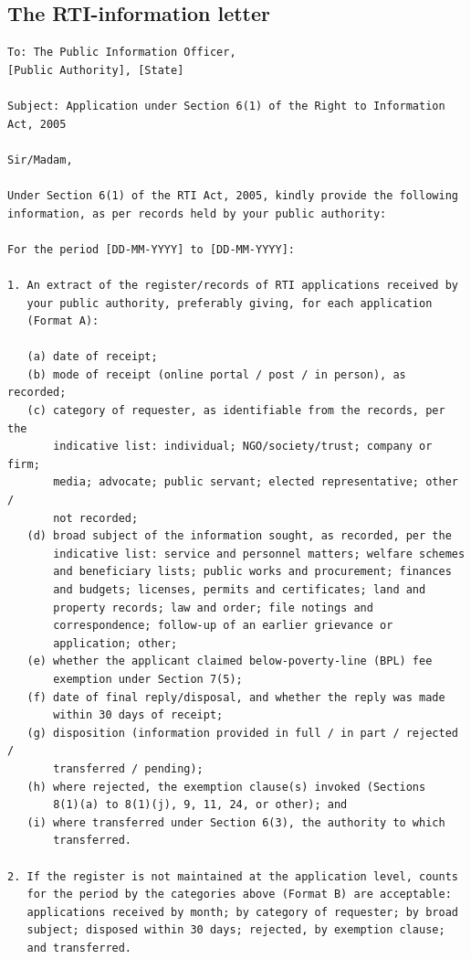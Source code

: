 \documentclass[11pt]{article}
\begin{document}
\subsection{The RTI-information letter}
\begin{footnotesize}
\begin{verbatim}
To: The Public Information Officer,
[Public Authority], [State]

Subject: Application under Section 6(1) of the Right to Information Act, 2005

Sir/Madam,

Under Section 6(1) of the RTI Act, 2005, kindly provide the following
information, as per records held by your public authority:

For the period [DD-MM-YYYY] to [DD-MM-YYYY]:

1. An extract of the register/records of RTI applications received by
   your public authority, preferably giving, for each application
   (Format A):

   (a) date of receipt;
   (b) mode of receipt (online portal / post / in person), as recorded;
   (c) category of requester, as identifiable from the records, per the
       indicative list: individual; NGO/society/trust; company or firm;
       media; advocate; public servant; elected representative; other /
       not recorded;
   (d) broad subject of the information sought, as recorded, per the
       indicative list: service and personnel matters; welfare schemes
       and beneficiary lists; public works and procurement; finances
       and budgets; licenses, permits and certificates; land and
       property records; law and order; file notings and
       correspondence; follow-up of an earlier grievance or
       application; other;
   (e) whether the applicant claimed below-poverty-line (BPL) fee
       exemption under Section 7(5);
   (f) date of final reply/disposal, and whether the reply was made
       within 30 days of receipt;
   (g) disposition (information provided in full / in part / rejected /
       transferred / pending);
   (h) where rejected, the exemption clause(s) invoked (Sections
       8(1)(a) to 8(1)(j), 9, 11, 24, or other); and
   (i) where transferred under Section 6(3), the authority to which
       transferred.

2. If the register is not maintained at the application level, counts
   for the period by the categories above (Format B) are acceptable:
   applications received by month; by category of requester; by broad
   subject; disposed within 30 days; rejected, by exemption clause;
   and transferred.


\end{verbatim}
\end{footnotesize}
\end{document}
